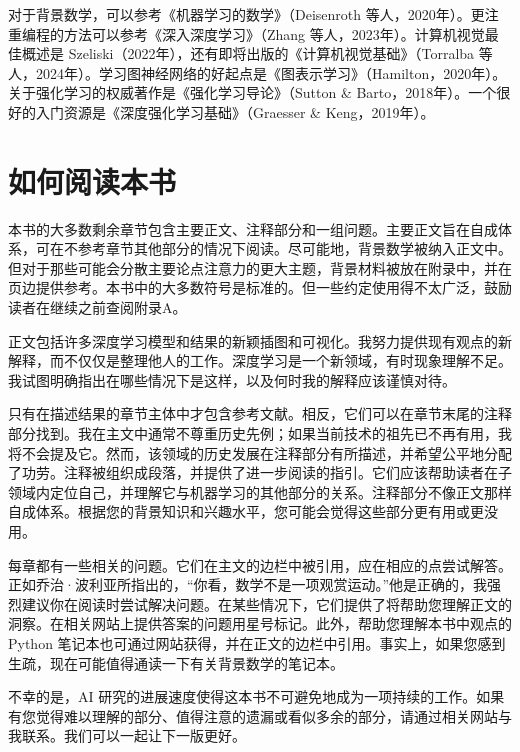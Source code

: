 对于背景数学，可以参考《机器学习的数学》（Deisenroth 等人，2020年）。更注重编程的方法可以参考《深入深度学习》（Zhang 等人，2023年）。计算机视觉最佳概述是 Szeliski（2022年），还有即将出版的《计算机视觉基础》（Torralba 等人，2024年）。学习图神经网络的好起点是《图表示学习》（Hamilton，2020年）。关于强化学习的权威著作是《强化学习导论》（Sutton \& Barto，2018年）。一个很好的入门资源是《深度强化学习基础》（Graesser \& Keng，2019年）。

\section{如何阅读本书}
本书的大多数剩余章节包含主要正文、注释部分和一组问题。主要正文旨在自成体系，可在不参考章节其他部分的情况下阅读。尽可能地，背景数学被纳入正文中。但对于那些可能会分散主要论点注意力的更大主题，背景材料被放在附录中，并在页边提供参考。本书中的大多数符号是标准的。但一些约定使用得不太广泛，鼓励读者在继续之前查阅附录A。

正文包括许多深度学习模型和结果的新颖插图和可视化。我努力提供现有观点的新解释，而不仅仅是整理他人的工作。深度学习是一个新领域，有时现象理解不足。我试图明确指出在哪些情况下是这样，以及何时我的解释应该谨慎对待。

只有在描述结果的章节主体中才包含参考文献。相反，它们可以在章节末尾的注释部分找到。我在主文中通常不尊重历史先例；如果当前技术的祖先已不再有用，我将不会提及它。然而，该领域的历史发展在注释部分有所描述，并希望公平地分配了功劳。注释被组织成段落，并提供了进一步阅读的指引。它们应该帮助读者在子领域内定位自己，并理解它与机器学习的其他部分的关系。注释部分不像正文那样自成体系。根据您的背景知识和兴趣水平，您可能会觉得这些部分更有用或更没用。

每章都有一些相关的问题。它们在主文的边栏中被引用，应在相应的点尝试解答。正如乔治·波利亚所指出的，“你看，数学不是一项观赏运动。”他是正确的，我强烈建议你在阅读时尝试解决问题。在某些情况下，它们提供了将帮助您理解正文的洞察。在相关网站上提供答案的问题用星号标记。此外，帮助您理解本书中观点的 Python 笔记本也可通过网站获得，并在正文的边栏中引用。事实上，如果您感到生疏，现在可能值得通读一下有关背景数学的笔记本。

不幸的是，AI 研究的进展速度使得这本书不可避免地成为一项持续的工作。如果有您觉得难以理解的部分、值得注意的遗漏或看似多余的部分，请通过相关网站与我联系。我们可以一起让下一版更好。

